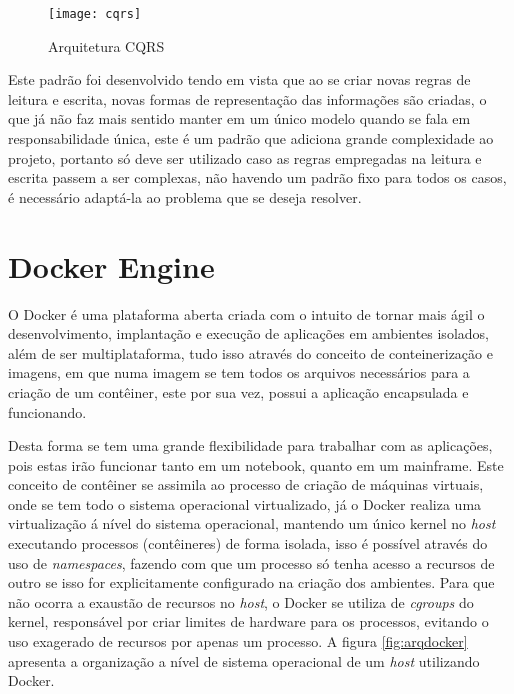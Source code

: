 \begin{figure}[!h]
\caption{\label{fig:cqrs} Arquitetura CQRS}
\begin{center}
\texttt{[image: cqrs]}
\end{center}
\end{figure}

Este padrão foi desenvolvido tendo em vista que ao se criar novas regras de leitura e escrita, novas formas de representação das informações são criadas, o que já não faz mais sentido manter em um único modelo quando se fala em responsabilidade única, este é um padrão que adiciona grande complexidade ao projeto, portanto só deve ser utilizado caso as regras empregadas na leitura e escrita passem a ser complexas, não havendo um padrão fixo para todos os casos, é necessário adaptá-la ao problema que se deseja resolver.~\cite{cqrs}

\section{Docker Engine}
\label{sec:docker}
O Docker é uma plataforma aberta criada com o intuito de tornar mais ágil o desenvolvimento, implantação e execução de aplicações em ambientes isolados, além de ser multiplataforma, tudo isso através do conceito de conteinerização e imagens, em que numa imagem se tem todos os arquivos necessários para a criação de um contêiner, este por sua vez, possui a aplicação encapsulada  e funcionando.

Desta forma se tem uma grande flexibilidade para trabalhar com as aplicações, pois estas irão funcionar tanto em um notebook, quanto em um mainframe. Este conceito de contêiner se assimila ao processo de criação de máquinas virtuais, onde se tem todo o sistema operacional virtualizado, já o Docker realiza uma virtualização á nível do sistema operacional, mantendo um único kernel no \textit{host} executando processos (contêineres) de forma isolada, isso é possível através do uso de \textit{namespaces}, fazendo com que um processo só tenha acesso a recursos de outro se isso for explicitamente configurado na criação dos ambientes. Para que não ocorra a exaustão de recursos no \textit{host}, o Docker se utiliza de \textit{cgroups} do kernel, responsável por criar limites de hardware para os processos, evitando o uso exagerado de recursos por apenas um processo. A figura \ref{fig:arqdocker} apresenta a organização a nível de sistema operacional de um \textit{host} utilizando Docker.~\cite{docker}


